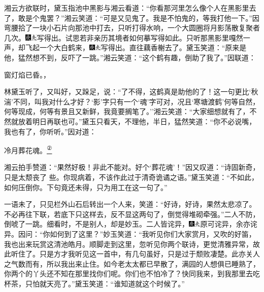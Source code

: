 湘云方欲联时，黛玉指池中黑影与湘云看道：``你看那河里怎么像个人在黑影里去了，敢是个鬼罢？''湘云笑道：``可是又见鬼了。我是不怕鬼的，等我打他一下。''因弯腰拾了一块小石片向那池中打去，只听打得水响，一个大圆圈将月影荡散复聚者几次。{\includegraphics[width=3mm]{../Images/00004}\includegraphics[width=3mm]{../Images/00012}\footnotesize \kaishu 写得出。试思若非亲历其境者如何摹写得如此。}只听那黑影里嘎然一声，却飞起一个大白鹤来，{\includegraphics[width=3mm]{../Images/00004}\includegraphics[width=3mm]{../Images/00012}\footnotesize \kaishu 写得出。}直往藕香榭去了。黛玉笑道：``原来是他，猛然想不到，反吓了一跳。''湘云笑道：``这个鹤有趣，倒助了我了。''因联道：

窗灯焰已昏。，

林黛玉听了，又叫好，又跺足，说：``了不得，这鹤真是助他的了！这一句更比`秋湍'不同，叫我对什么才好？`影'字只有一个`魂'字可对，况且`寒塘渡鹤'何等自然，何等现成，何等有景且又新鲜，我竟要搁笔了。''湘云笑道：``大家细想就有了，不然就放着明日再联也可。''黛玉只看天，不理他，半日，猛然笑道：``你不必说嘴，我也有了，你听听。''因对道：

冷月葬花魂。\href{../Text/part0080_split_000.html\#lnkback_2_a}{\textsuperscript{②}}

湘云拍手赞道：``果然好极！非此不能对。好个`葬花魂'！''因又叹道：``诗固新奇，只是太颓丧了
些。你现病着，不该作此过于清奇诡谲之语。''黛玉笑道：``不如此，如何压倒你。下句竟还未得，只为用工在这一句了。''

一语未了，只见栏外山石后转出一个人来，笑道：``好诗，好诗，果然太悲凉了。不必再往下联，若底下只这样去，反不显这两句了，倒觉得堆砌牵强。''二人不防，倒唬了一跳。细看时，不是别人，却是妙玉。二人皆诧异，{\includegraphics[width=3mm]{../Images/00004}\includegraphics[width=3mm]{../Images/00012}\footnotesize \kaishu 原可诧异，余亦诧异。}因问：``你如何到了这里？''妙玉笑道：``我听见你们大家赏月，又吹的好笛，我也出来玩赏这清池皓月。顺脚走到这里，忽听见你两个联诗，更觉清雅异常，故此听住了。只是方才我听见这一首中，有几句虽好，只是过于颓败凄楚。此亦关人之气数而有，所以我出来止住。如今老太太都已早散了，满园的人想俱已睡熟了，你两个的丫头还不知在那里找你们呢。你们也不怕冷了？快同我来，到我那里去吃杯茶，只怕就天亮了。''黛玉笑道：``谁知道就这个时候了。''

